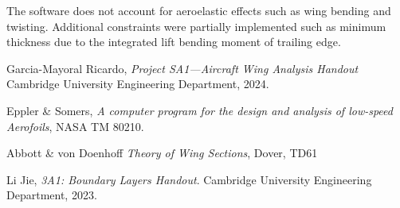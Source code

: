 \documentclass{article}
\begin{document}
The software does not account for aeroelastic effects such as wing bending and twisting.
Additional constraints were partially implemented such as minimum thickness due to the integrated lift bending moment of trailing edge.


\begin{thebibliography}{9}
    Garcia-Mayoral Ricardo, \textit{Project SA1—Aircraft Wing Analysis Handout} Cambridge University Engineering Department, 2024.

    Eppler \& Somers, \textit{A computer program for the design and analysis of low-speed Aerofoils}, NASA TM 80210.

    Abbott \& von Doenhoff \textit{Theory of Wing Sections}, Dover, TD61

    Li Jie, \textit{3A1: Boundary Layers Handout}. Cambridge University Engineering Department, 2023.
\end{thebibliography}
\end{document}
